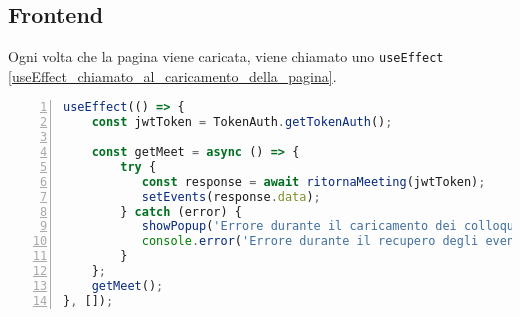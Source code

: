 \subsection{Frontend}
Ogni volta che la pagina viene caricata, viene chiamato uno \texttt{useEffect} \ref{useEffect_chiamato_al_caricamento_della_pagina}.
\begin{lstlisting}[language=typescript, frame=lines, basicstyle=\ttfamily\scriptsize, numbers=left,
    caption={useEffect chiamato al caricamento della pagina}, label={useEffect_chiamato_al_caricamento_della_pagina}]
useEffect(() => {
    const jwtToken = TokenAuth.getTokenAuth();
    
    const getMeet = async () => {
        try {
           const response = await ritornaMeeting(jwtToken);
           setEvents(response.data);
        } catch (error) {
           showPopup('Errore durante il caricamento dei colloqui', false);
           console.error('Errore durante il recupero degli eventi:', error);
        }
    };  
    getMeet();
}, []);
\end{lstlisting}
